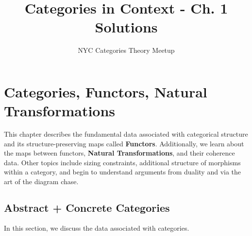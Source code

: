 \documentclass[10pt, oneside]{article}   	%
\title{Categories in Context - Ch. 1 Solutions}
\author{NYC Categories Theory Meetup}
\begin{document}
\maketitle

\section{Categories, Functors, Natural Transformations}

This chapter describes the fundamental data associated with categorical structure and its structure-preserving maps called \textbf{Functors}. Additionally, we learn about the maps between functors, \textbf{Natural Transformations}, and their coherence data. Other topics include sizing constraints, additional structure of morphisms within a category, and begin to understand arguments from duality and via the art of the diagram chase.

\subsection{Abstract + Concrete Categories}

In this section, we discuss the data associated with categories. 

\subsubsection{}
\end{document}
